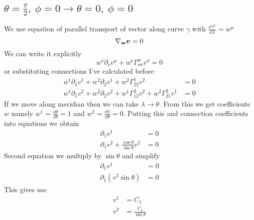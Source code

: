 \subsection*{$\theta = \frac{\pi}{2},~\phi = 0 \rightarrow \theta = 0,~ \phi = 0$}

We use equation of parallel transport of vector  along curve $\gamma$ with
$\frac{\dd \gamma^\mu}{\dd \lambda} = w^\mu$
%
\begin{equation}
    \nabla_{\boldsymbol{w}} \boldsymbol{v} = 0
\end{equation}
%
We can write it explicitly
%
\begin{equation}
    w^\nu \partial_\nu v^\mu + w^\nu \Gamma^\mu_{\nu\sigma} v^\sigma = 0
\end{equation}
%
or substituting connections I've calculated before
%
\begin{subequations}
    \begin{align}
        w^1 \partial_1 v^1 + w^2 \partial_2 v^1 + w^2 \Gamma^1_{22} v^2                         & = 0 \\
        w^1 \partial_1 v^2 + w^2 \partial_2 v^2 + w^1 \Gamma^2_{12} v^2 + w^2 \Gamma^2_{21} v^1 & = 0
    \end{align}
\end{subequations}
%
If we move along meridian then we can take $\lambda \rightarrow \theta$. From
this we get coefficients $w$ namely $w^1 = \frac{\dd \theta}{\dd \theta} = 1$
and $w^2 = \frac{\dd \phi}{\dd \theta} = 0$. Putting this and connection
coefficients into equations we obtain
%
\begin{subequations}
    \begin{align}
        \partial_1 v^1                                     & = 0 \\
        \partial_1 v^2 + \frac{\cos\theta}{\sin\theta} v^2 & = 0
    \end{align}
\end{subequations}
%
Second equation we multiply by $\sin\theta$ and simplify
%
\begin{subequations}
    \begin{align}
        \partial_1 v^1                        & = 0 \\
        \partial_1 \left(v^2\sin\theta\right) & = 0
    \end{align}
\end{subequations}
%
This gives use
%
\begin{subequations}
    \begin{align}
        v^1 & = C_1                    \\
        v^2 & = \frac{C_2}{\sin\theta}
    \end{align}
\end{subequations}
